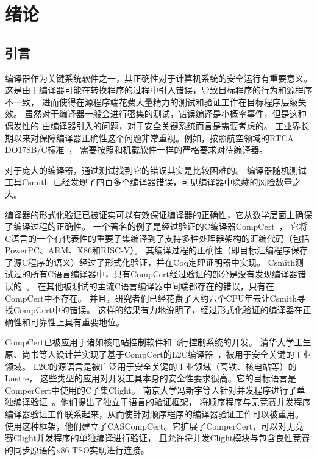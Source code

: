 
\chapter{绪论}


\section{引言}

编译器作为关键系统软件之一，其正确性对于计算机系统的安全运行有重要意义。
这是由于编译器可能在转换程序的过程中引入错误，导致目标程序的行为和源程序不一致，
进而使得在源程序端花费大量精力的测试和验证工作在目标程序层级失效。
虽然对于编译器一般会进行密集的测试，错误编译是小概率事件，但是这种偶发性的
由编译器引入的问题，对于安全关键系统而言是需要考虑的。
工业界长期以来对保障编译器正确性这个问题非常重视。例如，按照航空领域的RTCA DO178B/C标准~\cite{brosgol2010178c}，
需要按照和机载软件一样的严格要求对待编译器。

对于庞大的编译器，通过测试找到它的错误其实是比较困难的。
编译器随机测试工具Csmith~\cite{csmith2011}已经发现了四百多个编译器错误，可见编译器中隐藏的风险数量之大。

编译器的形式化验证已被证实可以有效保证编译器的正确性，它从数学层面上确保了编译过程的正确性。
一个著名的例子是经过验证的C编译器CompCert~\cite{leroy2009formally}，
它将C语言的一个有代表性的重要子集编译到了支持多种处理器架构的汇编代码（包括PowerPC、ARM、X86和RISC-V）。
其编译过程的正确性（即目标汇编程序保存了源C程序的语义）经过了形式化验证，并在Coq定理证明器中实现。
Csmith测试过的所有C语言编译器中，只有CompCert经过验证的部分是没有发现编译器错误的~\cite{csmith2011}。
在其他被测试的主流C语言编译器中间端都存在的错误，只有在CompCert中不存在。
并且，研究者们已经花费了大约六个CPU年去让Csmith寻找CompCert中的错误。
这样的结果有力地说明了，经过形式化验证的编译器在正确性和可靠性上具有重要地位。

CompCert已被应用于诸如核电站控制软件和飞行控制系统的开发。
清华大学王生原、尚书等人设计并实现了基于CompCert的L2C编译器~\cite{shang2017key}，被用于安全关键的工业领域。
L2C的源语言是被广泛用于安全关键的工业领域（高铁、核电站等）的Lustre，
这些类型的应用对开发工具本身的安全性要求很高。它的目标语言是ComperCert中使用的C子集Clight。
南京大学冯新宇等人针对并发程序进行了单独编译验证~\cite{jiang2019towards}。他们提出了独立于语言的验证框架，
将顺序程序与无竞赛并发程序编译器验证工作联系起来，从而使针对顺序程序的编译器验证工作可以被重用。
使用这种框架，他们建立了CASCompCert。它扩展了ComperCert，可以对无竞赛Clight并发程序的单独编译进行验证，
且允许将并发Clight模块与包含良性竞赛的同步原语的x86-TSO实现进行连接。

